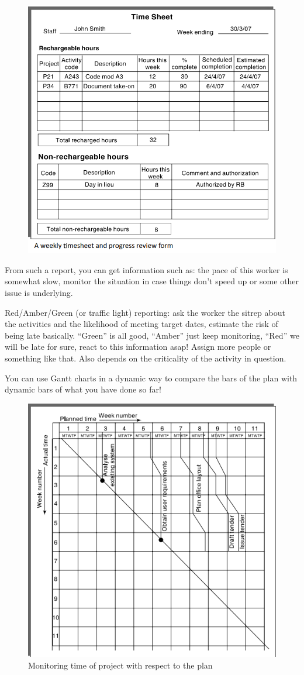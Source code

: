 \begin{figure} [H]
    \centering
    \includegraphics[width=0.5\linewidth]{Figures//06/weeklytimesheet.png}
\end{figure}

\noindent From such a report, you can get information such as: the pace of this worker is somewhat slow, monitor the situation in case things don't speed up or some other issue is underlying.

\noindent Red/Amber/Green (or traffic light) reporting: ask the worker the sitrep about the activities and the likelihood of meeting target dates, estimate the risk of being late basically. ``Green'' is all good, ``Amber'' just keep monitoring, ``Red'' we will be late for sure, react to this information asap! Assign more people or something like that. Also depends on the criticality of the activity in question.

\noindent You can use Gantt charts in a dynamic way to compare the bars of the plan with dynamic bars of what you have done so far!

\begin{figure} [H]
    \centering
    \includegraphics[width=0.5\linewidth]{Figures//06/timeline.png}
    \caption{Monitoring time of project with respect to the plan}
\end{figure}

